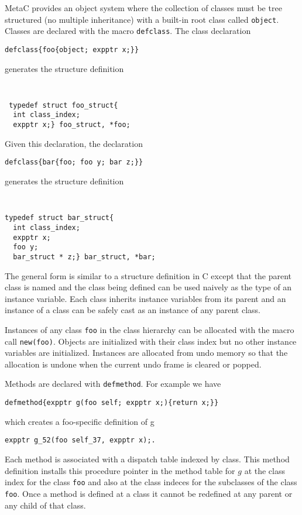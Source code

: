 \documentclass{article}
\begin{document}
MetaC provides an object system where the collection of classes must be tree structured (no multiple inheritance) with
a built-in root class called {\tt object}. Classes are declared with the macro {\tt defclass}.  The class declaration

\medskip
\centerline{\tt defclass\{foo\{object; expptr x;\}\}}

generates the structure definition

{\tt
\begin{verbatim}
 typedef struct foo_struct{
  int class_index;
  expptr x;} foo_struct, *foo;
\end{verbatim}
}
Given this declaration, the declaration

\medskip
\centerline{\tt defclass\{bar\{foo; foo y; bar z;\}\}}

generates the structure definition
{\tt
\begin{verbatim}
typedef struct bar_struct{
  int class_index;
  expptr x;
  foo y;
  bar_struct * z;} bar_struct, *bar;
\end{verbatim}
}

The general form is similar to a structure definition in C except that the parent class is named
and the class being defined can be used naively as the type of an instance variable.
Each class inherits instance variables from its parent and an instance of a class can be safely cast as an instance of any parent class.

Instances of any class {\tt foo} in the class hierarchy can be allocated with the macro call {\tt new(foo)}.  Objects are initialized
with their class index but no other instance variables are initialized. Instances are allocated from undo memory
so that the allocation is undone when the current undo frame is cleared or popped.

Methods are declared with {\tt defmethod}.  For example we have

\medskip
\centerline{\tt defmethod\{expptr g(foo self; expptr x;)\{return x;\}\}}

which creates a foo-specific definition of g

\medskip
\centerline{\tt expptr g\_52(foo self\_37, expptr x);.}

Each method is associated with a dispatch table indexed by class.  This method definition installs this procedure pointer
in the method table for $g$ at the class index for the class {\tt foo} and also at the class indeces for the subclasses of the class {\tt foo}.
Once a method is defined at a class it cannot be redefined at any parent or any child of that class.
\end{document}
